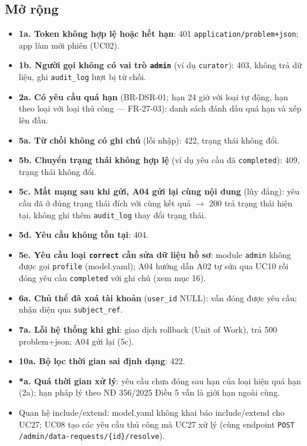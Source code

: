 \subsection{Mở rộng}
\begin{itemize}
\item \textbf{1a. Token không hợp lệ hoặc hết hạn}: 401 {\small\texttt{application/\allowbreak{}\allowbreak{}problem+json}}; app làm mới phiên (UC02).
\item \textbf{1b. Người gọi không có vai trò {\small\texttt{admin}}} (ví dụ {\small\texttt{curator}}): 403, không trả dữ liệu, ghi {\small\texttt{audit\_\allowbreak{}\allowbreak{}log}} lượt bị từ chối.
\item \textbf{2a. Có yêu cầu quá hạn} (BR-\allowbreak{}DSR-\allowbreak{}01; hạn 24 giờ với loại tự động, hạn theo loại với loại thủ công --- FR-\allowbreak{}27-\allowbreak{}03): danh sách đánh dấu quá hạn và xếp lên đầu.
\item \textbf{5a. Từ chối không có ghi chú} (lỗi nhập): 422, trạng thái không đổi.
\item \textbf{5b. Chuyển trạng thái không hợp lệ} (ví dụ yêu cầu đã {\small\texttt{completed}}): 409, trạng thái không đổi.
\item \textbf{5c. Mất mạng sau khi gửi, A04 gửi lại cùng nội dung} (lũy đẳng): yêu cầu đã ở đúng trạng thái đích với cùng kết quả \ensuremath{\rightarrow} 200 trả trạng thái hiện tại, không ghi thêm {\small\texttt{audit\_\allowbreak{}\allowbreak{}log}} thay đổi trạng thái.
\item \textbf{5d. Yêu cầu không tồn tại}: 404.
\item \textbf{5e. Yêu cầu loại {\small\texttt{correct}} cần sửa dữ liệu hồ sơ}: module {\small\texttt{admin}} không được gọi {\small\texttt{profile}} (model.yaml); A04 hướng dẫn A02 tự sửa qua UC10 rồi đóng yêu cầu {\small\texttt{completed}} với ghi chú (xem mục 16).
\item \textbf{6a. Chủ thể đã xoá tài khoản} ({\small\texttt{user\_\allowbreak{}\allowbreak{}id}} NULL): vẫn đóng được yêu cầu; nhận diện qua {\small\texttt{subject\_\allowbreak{}\allowbreak{}ref}}.
\item \textbf{7a. Lỗi hệ thống khi ghi}: giao dịch rollback (Unit of Work), trả 500 problem+json; A04 gửi lại (5c).
\item \textbf{10a. Bộ lọc thời gian sai định dạng}: 422.
\item \textbf{*a. Quá thời gian xử lý}: yêu cầu chưa đóng sau hạn của loại hiện quá hạn (2a); hạn pháp lý theo NĐ 356/\allowbreak{}2025 Điều 5 vẫn là giới hạn ngoài cùng.
\item Quan hệ include/\allowbreak{}extend: model.yaml không khai báo include/\allowbreak{}extend cho UC27; UC08 tạo các yêu cầu thủ công mà UC27 xử lý (cùng endpoint {\small\texttt{POST /\allowbreak{}\allowbreak{}admin/\allowbreak{}\allowbreak{}data-\allowbreak{}requests/\allowbreak{}\allowbreak{}\{id\}/\allowbreak{}\allowbreak{}resolve}}).
\end{itemize}
